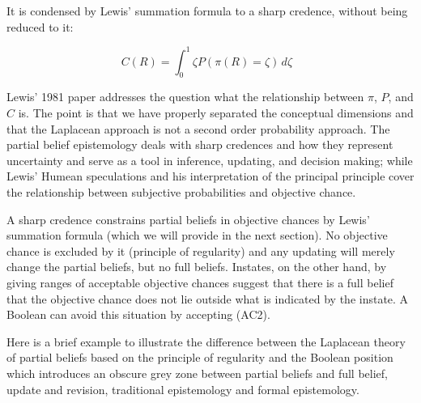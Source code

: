 \documentclass[11pt]{article}
\begin{document}
It is condensed by Lewis' summation formula to a sharp credence,
without being reduced to it:

\begin{equation}
  \label{eq:s2}
  C(R)=\int_{0}^{1}\zeta{}P(\pi(R)=\zeta)\,d\zeta\mbox{ }
\end{equation}

Lewis' 1981 paper 
addresses the question what the relationship between $\pi$, $P$, and
$C$ is. The point is that we have properly separated the conceptual
dimensions and that the Laplacean approach is not a second order
probability approach. The partial belief epistemology deals with sharp
credences and how they represent uncertainty and serve as a tool in
inference, updating, and decision making; while Lewis' Humean
speculations and his interpretation of the principal principle cover
the relationship between subjective probabilities and objective
chance.

A sharp credence constrains partial beliefs in objective chances by
Lewis' summation formula (which we will provide in the next section).
No objective chance is excluded by it (principle of regularity) and
any updating will merely change the partial beliefs, but no full
beliefs. Instates, on the other hand, by giving ranges of acceptable
objective chances suggest that there is a full belief that the
objective chance does not lie outside what is indicated by the
instate. A Boolean can avoid this situation by accepting (AC2).

Here is a brief example to illustrate the difference between the
Laplacean theory of partial beliefs based on the principle of
regularity and the Boolean position which introduces an obscure grey
zone between partial beliefs and full belief, update and revision,
traditional epistemology and formal epistemology.

\end{document}
